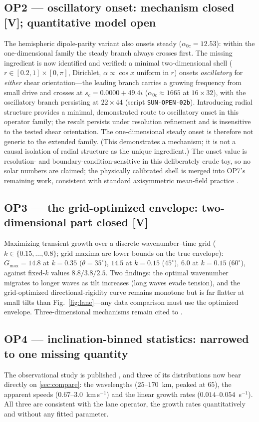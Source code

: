 \documentclass[11pt]{article}
\renewcommand{\S}{\mathhexbox278}
\theoremstyle{definition}
\theoremstyle{remark}
\begin{document}
\subsection*{OP2 --- oscillatory onset: mechanism closed [V]; quantitative model open}
The hemispheric dipole-parity variant also onsets steady
($\alpha_{0c}=12.53$): within the one-dimensional family the steady branch
always crosses first. The missing ingredient is now identified and verified:
a minimal two-dimensional shell ($r\in[0.2,1]\times[0,\pi]$, Dirichlet,
$\alpha\propto\cos x$ uniform in $r$) onsets \emph{oscillatory} for
\emph{either} shear orientation---the leading branch carries a growing
frequency from small drive and crosses at $s_c = 0.0000 + 49.4i$
($\alpha_{0c}\approx1665$ at $16\times32$), with the oscillatory branch
persisting at $22\times44$ (script \texttt{SUN-OPEN-02b}). Introducing radial structure provides a minimal, demonstrated route to
oscillatory onset in this operator family; the result persists under
resolution refinement and is insensitive to the tested shear orientation.
The one-dimensional steady onset is therefore not generic to the extended
family. (This demonstrates a mechanism; it is not a causal isolation of
radial structure as the unique ingredient.) The onset value is resolution- and
boundary-condition-sensitive in this deliberately crude toy, so no solar
numbers are claimed; the physically calibrated shell is merged into OP7's
remaining work, consistent with standard axisymmetric mean-field practice
\cite{charbonneau}.

\subsection*{OP3 --- the grid-optimized envelope: two-dimensional part closed [V]}
Maximizing transient growth over a discrete wavenumber--time grid
($k\in\{0.15,\ldots,0.8\}$; grid maxima are lower bounds on the true
envelope): $G_{\max}=14.8$ at $k=0.35$
($\theta=35^\circ$), $14.5$ at $k=0.15$ ($45^\circ$), $6.0$ at $k=0.15$
($60^\circ$), against fixed-$k$ values $8.8/3.8/2.5$. Two findings: the
optimal wavenumber migrates to longer waves as tilt increases (long waves
evade tension), and the grid-optimized directional-rigidity curve remains
monotone but is far flatter at small tilts than Fig.~\ref{fig:lane}---any
data comparison must use the optimized envelope. Three-dimensional
mechanisms remain cited to \cite{fraser}.

\subsection*{OP4 --- inclination-binned statistics: narrowed to one missing quantity}
The observational study is published \cite{dkist}, and three of its
distributions now bear directly on \S\ref{sec:compare}: the wavelengths
($25$--$170$~km, peaked at $65$), the apparent speeds
($0.67$--$3.0$~km\,s$^{-1}$) and the linear growth rates
($0.014$--$0.054$~s$^{-1}$). All three are consistent with the lane operator,
the growth rates quantitatively and without any fitted parameter.
\end{document}
